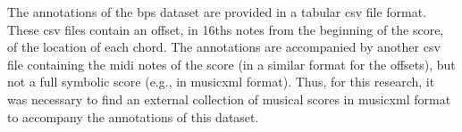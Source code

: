 

The annotations of the \gls{bps} dataset are provided in a
tabular \gls{csv} file format. These \gls{csv} files contain
an offset, in \glspl{16th} notes from the beginning of the
score, of the location of each chord. The annotations are
accompanied by another \gls{csv} file containing the
\gls{midi} notes of the score (in a similar format for the
offsets), but not a full symbolic score (e.g., in
\gls{musicxml} format). Thus, for this research, it was
necessary to find an external collection of musical scores
in \gls{musicxml} format to accompany the annotations of
this dataset. 
